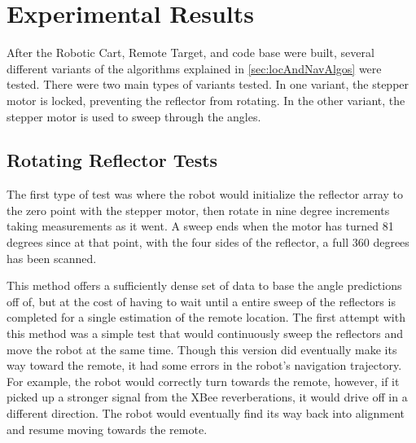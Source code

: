 \section{Experimental Results}
\label{sec:Experimental Results}

After the Robotic Cart, Remote Target, and code base were built, several different variants of the algorithms explained in \autoref{sec:locAndNavAlgos} were tested. There were two main types of variants tested. In one variant, the stepper motor is locked, preventing the reflector from rotating. In the other variant, the stepper motor is used to sweep through the angles.

\subsection{Rotating Reflector Tests}

The first type of test was where the robot would initialize the reflector array to the zero point with the stepper motor, then rotate in nine degree increments taking measurements as it went. A sweep ends when the motor has turned 81 degrees since at that point, with the four sides of the reflector, a full 360 degrees has been scanned.

\vspace*{12pt}
\noindent
This method offers a sufficiently dense set of data to base the angle predictions off of, but at the cost of having to wait until a entire sweep of the reflectors is completed for a single estimation of the remote location. The first attempt with this method was a simple test that would continuously sweep the reflectors and move the robot at the same time. Though this version did eventually make its way toward the remote, it had some errors in the robot's navigation trajectory. For example, the robot would correctly turn towards the remote, however, if it picked up a stronger signal from the XBee reverberations, it would drive off in a different direction. The robot would eventually find its way back into alignment and resume moving towards the remote.

